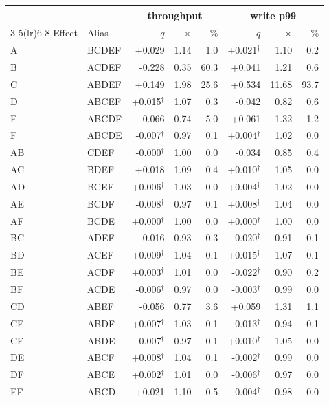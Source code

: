 \begin{tabular}{@{}llrrrrrr@{}}
\toprule
 & & \multicolumn{3}{c}{throughput} & \multicolumn{3}{c}{write p99} \\
\cmidrule(lr){3-5}\cmidrule(lr){6-8}
Effect & Alias & $q$ & $\times$ & \% & $q$ & $\times$ & \% \\
\midrule
A & BCDEF & +0.029 & 1.14 & 1.0 & +0.021$^\dagger$ & 1.10 & 0.2 \\
B & ACDEF & -0.228 & 0.35 & 60.3 & +0.041 & 1.21 & 0.6 \\
C & ABDEF & +0.149 & 1.98 & 25.6 & +0.534 & 11.68 & 93.7 \\
D & ABCEF & +0.015$^\dagger$ & 1.07 & 0.3 & -0.042 & 0.82 & 0.6 \\
E & ABCDF & -0.066 & 0.74 & 5.0 & +0.061 & 1.32 & 1.2 \\
F & ABCDE & -0.007$^\dagger$ & 0.97 & 0.1 & +0.004$^\dagger$ & 1.02 & 0.0 \\
AB & CDEF & -0.000$^\dagger$ & 1.00 & 0.0 & -0.034 & 0.85 & 0.4 \\
AC & BDEF & +0.018 & 1.09 & 0.4 & +0.010$^\dagger$ & 1.05 & 0.0 \\
AD & BCEF & +0.006$^\dagger$ & 1.03 & 0.0 & +0.004$^\dagger$ & 1.02 & 0.0 \\
AE & BCDF & -0.008$^\dagger$ & 0.97 & 0.1 & +0.008$^\dagger$ & 1.04 & 0.0 \\
AF & BCDE & +0.000$^\dagger$ & 1.00 & 0.0 & +0.000$^\dagger$ & 1.00 & 0.0 \\
BC & ADEF & -0.016 & 0.93 & 0.3 & -0.020$^\dagger$ & 0.91 & 0.1 \\
BD & ACEF & +0.009$^\dagger$ & 1.04 & 0.1 & +0.015$^\dagger$ & 1.07 & 0.1 \\
BE & ACDF & +0.003$^\dagger$ & 1.01 & 0.0 & -0.022$^\dagger$ & 0.90 & 0.2 \\
BF & ACDE & -0.006$^\dagger$ & 0.97 & 0.0 & -0.003$^\dagger$ & 0.99 & 0.0 \\
CD & ABEF & -0.056 & 0.77 & 3.6 & +0.059 & 1.31 & 1.1 \\
CE & ABDF & +0.007$^\dagger$ & 1.03 & 0.1 & -0.013$^\dagger$ & 0.94 & 0.1 \\
CF & ABDE & -0.007$^\dagger$ & 0.97 & 0.1 & +0.010$^\dagger$ & 1.05 & 0.0 \\
DE & ABCF & +0.008$^\dagger$ & 1.04 & 0.1 & -0.002$^\dagger$ & 0.99 & 0.0 \\
DF & ABCE & +0.002$^\dagger$ & 1.01 & 0.0 & -0.006$^\dagger$ & 0.97 & 0.0 \\
EF & ABCD & +0.021 & 1.10 & 0.5 & -0.004$^\dagger$ & 0.98 & 0.0 \\

\end{tabular}
